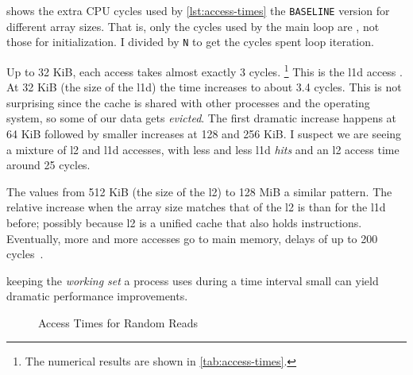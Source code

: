 
 shows the extra CPU cycles used by \cref{lst:access-times}
 the \texttt{BASELINE}
version for different array sizes.
That is, only the cycles used by the main loop are , not those for
initialization.  I divided by \texttt{N} to get the cycles spent  loop iteration.

Up to 32 KiB, each access takes almost exactly 3 cycles.%
\footnote{The numerical results are shown in \vref{tab:access-times}.}
This is the \gls{l1d} access .  At 32 KiB (the size of the \gls{l1d})
the time increases to about 3.4 cycles.  This is not surprising since the cache is shared
with other processes and the operating system, so some of our data gets \emph{evicted}.
The first dramatic increase happens at 64 KiB followed by smaller increases at 128 and 256
KiB.  I suspect we are seeing a mixture of \gls{l2} and \gls{l1d} accesses, with less and
less \gls{l1d} \emph{hits} and an \gls{l2} access time  around 25 cycles.

The values from 512 KiB (the size of the \gls{l2}) to 128 MiB  a
similar pattern.  The relative increase when the array size matches that of the \gls{l2}
is  than for the \gls{l1d} before; possibly because \gls{l2}
is a unified cache that also holds instructions.  Eventually, more and more accesses go to
main memory,  delays of up to 200
cycles~\cite[cf.][\pno~17, figure 3.4]{drepper2007}.

 keeping the \emph{working set} a process
uses during a time interval small can yield dramatic performance improvements.

\begin{figure}
   \centering
   
   \caption{Access Times for Random Reads}
   \label{fig:access-times}
\end{figure}

